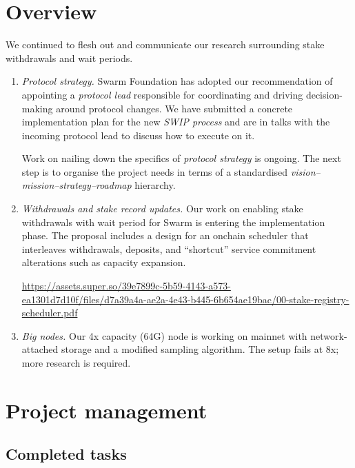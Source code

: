 \maketitle
\section*{Overview}

We continued to flesh out and communicate our research surrounding stake withdrawals and wait periods.

\begin{enumerate}
  \item \emph{Protocol strategy.}
    Swarm Foundation has adopted our recommendation of appointing a \emph{protocol lead} responsible for coordinating and driving decision-making around protocol changes.
    We have submitted a concrete implementation plan for the new \emph{SWIP process} and are in talks with the incoming protocol lead to discuss how to execute on it.

    Work on nailing down the specifics of \emph{protocol strategy} is ongoing. The next step is to organise the project needs in terms of a standardised \emph{vision–mission–strategy–roadmap} hierarchy.

  \item \emph{Withdrawals and stake record updates.} 
    Our work on enabling stake withdrawals with wait period for Swarm is entering the implementation phase. The proposal includes a design for an onchain scheduler that interleaves withdrawals, deposits, and “shortcut” service commitment alterations such as capacity expansion.

    \url{https://assets.super.so/39e7899c-5b59-4143-a573-ea1301d7d10f/files/d7a39a4a-ae2a-4e43-b445-6b654ae19bac/00-stake-registry-scheduler.pdf}

  \item \emph{Big nodes.}
    Our 4x capacity (64G) node is working on mainnet with network-attached storage and a modified sampling algorithm.
    The setup fails at 8x; more research is required.

\end{enumerate}

\section*{Project management}

\subsection*{Completed tasks}

